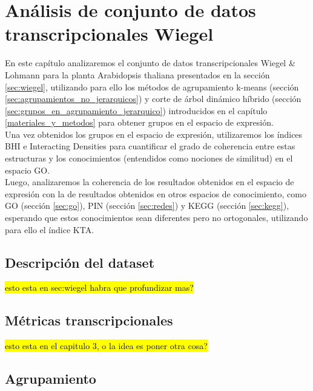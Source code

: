 \chapter{Análisis de conjunto de datos transcripcionales Wiegel}
En este capítulo analizaremos el conjunto de datos transcripcionales Wiegel \& Lohmann para la planta Arabidopsis thaliana presentados en la sección \ref{sec:wiegel}, utilizando para ello los métodos de agrupamiento k-means (sección \ref{sec:agrupamientos_no_jerarquicos}) y corte de árbol dinámico híbrido (sección \ref{sec:grupos_en_agrupamiento_jerarquico}) introducidos en el capítulo \ref{materiales_y_metodos} para obtener grupos en el espacio de expresión.\\
Una vez obtenidos los grupos en el espacio de expresión, utilizaremos los índices BHI e Interacting Densities para cuantificar el grado de coherencia entre estas estructuras y los conocimientos (entendidos como nociones de similitud) en el espacio GO.\\
Luego, analizaremos la coherencia de los resultados obtenidos en el espacio de expresión con la de resultados obtenidos en otros espacios de conocimiento, como GO (sección \ref{sec:go}), PIN  (sección \ref{sec:redes}) y KEGG (sección \ref{sec:kegg}), esperando que estos conocimientos sean diferentes pero no ortogonales, utilizando para ello el índice KTA. 

\section{Descripción del dataset}
\hl{esto esta en sec:wiegel habra que profundizar mas?}
\section{Métricas transcripcionales}
\hl{esto esta en el capitulo 3, o la idea es poner otra cosa?}
\section{Agrupamiento}

